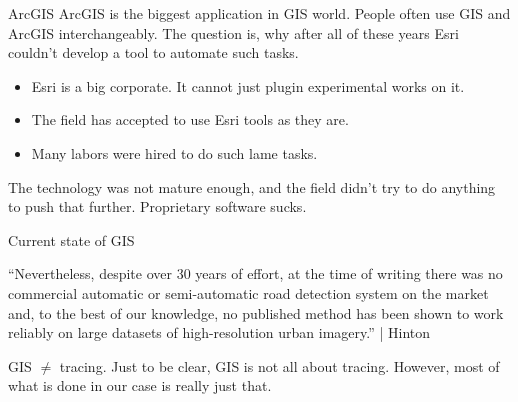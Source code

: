 \documentclass{beamer}
\begin{document}
\begin{frame}{ArcGIS}
ArcGIS is the biggest application in GIS world. People often use GIS and ArcGIS
interchangeably. The question is, why after all of these years Esri couldn't
develop a tool to automate such tasks.

\begin{itemize}
\item Esri is a big corporate. It cannot just plugin experimental works on it.
\item The field has accepted to use Esri tools as they are.
\item Many labors were hired to do such lame tasks.
\end{itemize}
The technology was not mature enough, and the field didn't try to do anything to
push that further. Proprietary software sucks.
\end{frame}

\begin{frame}{Current state of GIS}
  
  ``Nevertheless, despite over 30 years of effort, at the time of writing there was
no commercial automatic or semi-automatic road detection system on the market
and, to the best of our knowledge, no published method has been shown to work reliably on large datasets of high-resolution urban imagery.'' | Hinton

\end{frame}

\begin{frame}{GIS $\neq$ tracing.}
Just to be clear, GIS is not all about tracing. However, most of what is done in
our case is really just that.
\end{frame}
\end{document}
